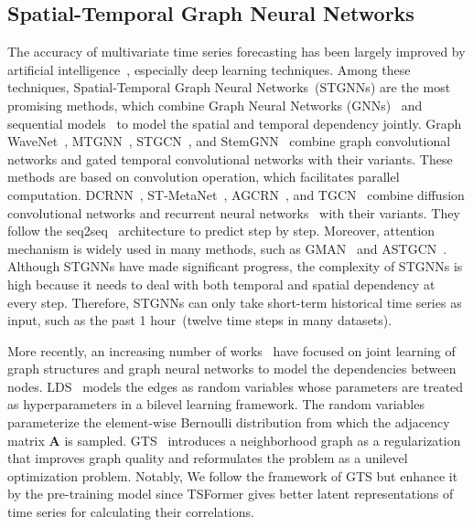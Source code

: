 \documentclass[sigconf]{acmart}
\begin{document}
\subsection{Spatial-Temporal Graph Neural Networks}
The accuracy of multivariate time series forecasting has been largely improved by artificial intelligence~\cite{Innovation}, especially deep learning techniques.
Among these techniques, Spatial-Temporal Graph Neural Networks~(STGNNs) are the most promising methods, 
which combine Graph Neural Networks (GNNs)~\cite{2017GCN, 2016ChebNet} and sequential models~\cite{2014GRU, 2014Seq2Seq} to model the spatial and temporal dependency jointly.
Graph WaveNet~\cite{GWNet}, MTGNN~\cite{2020MTGNN}, STGCN~\cite{2018STGCN}, and StemGNN~\cite{2020StemGNN} combine graph convolutional networks and gated temporal convolutional networks with their variants. These methods are based on convolution operation, which facilitates parallel computation.
DCRNN~\cite{2017DCRNN}, ST-MetaNet~\cite{2019STMetaNet}, AGCRN~\cite{2020AdaptiveGCRN}, and TGCN~\cite{2019TGCN} combine diffusion convolutional networks and recurrent neural networks~\cite{2014GRU, 2014Seq2Seq} with their variants. 
They follow the seq2seq~\cite{2014Seq2Seq} architecture to predict step by step.
Moreover, attention mechanism is widely used in many methods, such as GMAN~\cite{2020GMAN} and ASTGCN~\cite{2019ASTGCN}. 
Although STGNNs have made significant progress, the complexity of STGNNs is high because it needs to deal with both temporal and spatial dependency at every step.
Therefore, STGNNs can only take short-term historical time series as input, such as the past 1 hour~(twelve time steps in many datasets).

More recently, an increasing number of works~\cite{2018NRI, 2019LDS, 2021GTS} have focused on joint learning of graph structures and graph neural networks to model the dependencies between nodes.
LDS~\cite{2019LDS} models the edges as random variables whose parameters are treated as hyperparameters in a bilevel learning framework.
The random variables parameterize the element-wise Bernoulli distribution from which the adjacency matrix $\mathbf{A}$ is sampled.
GTS~\cite{2021GTS} introduces a neighborhood graph as a regularization that improves graph quality and reformulates the problem as a unilevel optimization problem.
Notably, We follow the framework of GTS but enhance it by the pre-training model since TSFormer gives better latent representations of time series for calculating their correlations.
\end{document}
